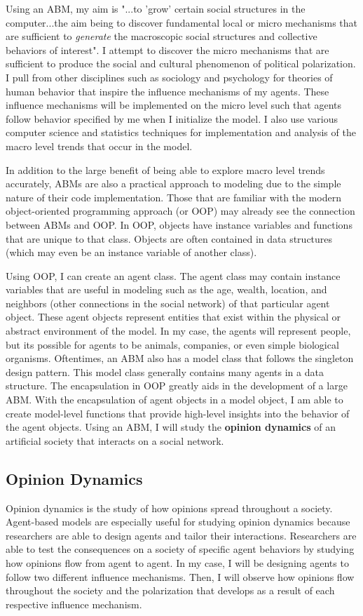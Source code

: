 Using an ABM, my aim is "...to 'grow' certain social structures in the computer...the aim being to discover fundamental local or micro mechanisms that are sufficient to \textit{generate} the macroscopic social structures and collective behaviors of interest\cite{epstein_growing_1996}". I attempt to discover the micro mechanisms that are sufficient to produce the social and cultural phenomenon of political polarization. I pull from other disciplines such as sociology and psychology for theories of human behavior that inspire the influence mechanisms of my agents. These influence mechanisms will be implemented on the micro level such that agents follow behavior specified by me when I initialize the model. I also use various computer science and statistics techniques for implementation and analysis of the macro level trends that occur in the model.    

In addition to the large benefit of being able to explore macro level trends accurately, ABMs are also a practical approach to modeling due to the simple nature of their code implementation. Those that are familiar with the modern object-oriented programming approach (or OOP) may already see the connection between ABMs and OOP. In OOP, objects have instance variables and functions that are unique to that class. Objects are often contained in data structures (which may even be an instance variable of another class). 

Using OOP, I can create an agent class. The agent class may contain instance variables that are useful in modeling such as the age, wealth, location, and neighbors (other connections in the social network) of that particular agent object. These agent objects represent entities that exist within the physical or abstract environment of the model. In my case, the agents will represent people, but its possible for agents to be animals, companies, or even simple biological organisms. Oftentimes, an ABM also has a model class that follows the singleton design pattern. This model class generally contains many agents in a data structure. The encapsulation in OOP greatly aids in the development of a large ABM. With the encapsulation of agent objects in a model object, I am able to create model-level functions that provide high-level insights into the behavior of the agent objects. Using an ABM, I will study the \textbf{opinion dynamics} of an artificial society that interacts on a social network.


\subsection{Opinion Dynamics}
Opinion dynamics is the study of how opinions spread throughout a society. Agent-based models are especially useful for studying opinion dynamics because researchers are able to design agents and tailor their interactions. Researchers are able to test the consequences on a society of specific agent behaviors by studying how opinions flow from agent to agent. In my case, I will be designing agents to follow two different influence mechanisms. Then, I will observe how opinions flow throughout the society and the polarization that develops as a result of each respective influence mechanism.

